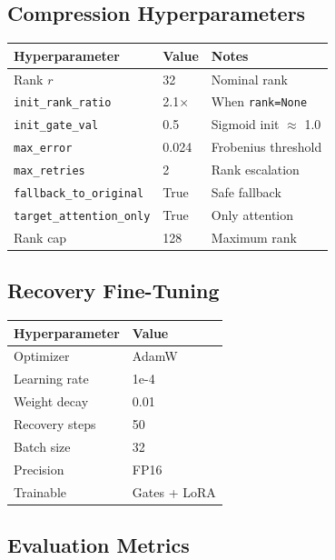 \subsection{Compression Hyperparameters}

\begin{table}[H]
\centering
\small
\begin{tabular}{lll}
\toprule
\textbf{Hyperparameter} & \textbf{Value} & \textbf{Notes} \\
\midrule
Rank $r$ & 32 & Nominal rank \\
\texttt{init\_rank\_ratio} & 2.1$\times$ & When \texttt{rank=None} \\
\texttt{init\_gate\_val} & 0.5 & Sigmoid init $\approx$ 1.0 \\
\texttt{max\_error} & 0.024 & Frobenius threshold \\
\texttt{max\_retries} & 2 & Rank escalation \\
\texttt{fallback\_to\_original} & True & Safe fallback \\
\texttt{target\_attention\_only} & True & Only attention \\
Rank cap & 128 & Maximum rank \\
\bottomrule
\end{tabular}
\end{table}

\subsection{Recovery Fine-Tuning}

\begin{table}[H]
\centering
\small
\begin{tabular}{ll}
\toprule
\textbf{Hyperparameter} & \textbf{Value} \\
\midrule
Optimizer & AdamW \\
Learning rate & 1e-4 \\
Weight decay & 0.01 \\
Recovery steps & 50 \\
Batch size & 32 \\
Precision & FP16 \\
Trainable & Gates + LoRA \\
\bottomrule
\end{tabular}
\end{table}

\subsection{Evaluation Metrics}

